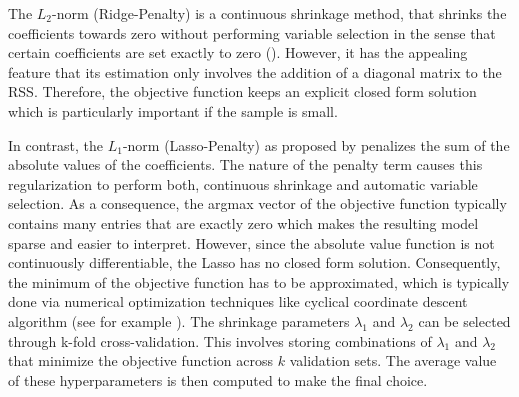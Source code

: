 The $L_2$-norm (Ridge-Penalty) is a continuous shrinkage method, that shrinks the coefficients towards zero without performing variable selection in the sense that certain coefficients are set exactly to zero (\cite{hoerl:1970}). However, it has the appealing feature that its estimation only involves the addition of a diagonal matrix to the \ac{RSS}. Therefore, the objective function keeps an explicit closed form solution which is particularly important if the sample is small.

In contrast, the $L_1$-norm (Lasso-Penalty) as proposed by \cite{tibshirani:1996} penalizes the sum of the absolute values of the coefficients. The nature of the penalty term causes this regularization to perform both, continuous shrinkage and automatic variable selection. As a consequence, the argmax vector of the objective function typically contains many entries that are exactly zero which makes the resulting model sparse and easier to interpret. However, since the absolute value function is not continuously differentiable, the Lasso has no closed form solution. Consequently, the minimum of the objective function has to be approximated, which is typically done via numerical optimization techniques like cyclical coordinate descent algorithm (see for example \cite{friedman:2010}). The shrinkage parameters $\lambda_1$ and $\lambda_2$ can be selected through k-fold cross-validation. This involves storing combinations of $\lambda_1$ and $\lambda_2$ that minimize the objective function across $k$ validation sets. The average value of these hyperparameters is then computed to make the final choice.

